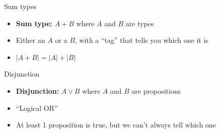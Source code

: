 \documentclass{beamer}
\begin{document}
\begin{frame}{Sum types}
    \begin{itemize}
        \item \textbf{Sum type:} $A + B$ where $A$ and $B$ are types
        \item Either an $A$ or a $B$, with a ``tag'' that tells you which one it is
        \item $|A + B| = |A| + |B|$
    \end{itemize}

    \begin{prooftree}
    \end{prooftree}
    
    \begin{prooftree}
    \end{prooftree}
    
    \begin{prooftree}
    \end{prooftree}
\end{frame}

\begin{frame}{Disjunction}
    \begin{itemize}
        \item \textbf{Disjunction:} $A \lor B$ where $A$ and $B$ are propositions
        \item ``Logical OR''
        \item At least 1 proposition is true, but we can't always tell which one
    \end{itemize}

    \begin{prooftree}
    \end{prooftree}
    
    \begin{prooftree}
    \end{prooftree}
    
    \begin{prooftree}
    \end{prooftree}
\end{frame}
\end{document}
